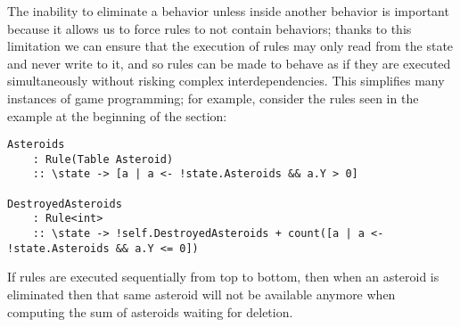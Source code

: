 
The inability to eliminate a behavior unless inside another behavior is important because it allows us to force rules to not contain behaviors; thanks to this limitation we can ensure that the execution of rules may only read from the state and never write to it, and so rules can be made to behave as if they are executed simultaneously without risking complex interdependencies. This simplifies many instances of game programming; for example, consider the rules seen in the example at the beginning of the section:

\begin{lstlisting}
Asteroids           
    : Rule(Table Asteroid)
    :: \state -> [a | a <- !state.Asteroids && a.Y > 0]
  	    
DestroyedAsteroids	
    : Rule<int>
    :: \state -> !self.DestroyedAsteroids + count([a | a <- !state.Asteroids && a.Y <= 0])
\end{lstlisting}

If rules are executed sequentially from top to bottom, then when an asteroid is eliminated then that same asteroid will not be available anymore when computing the sum of asteroids waiting for deletion.

